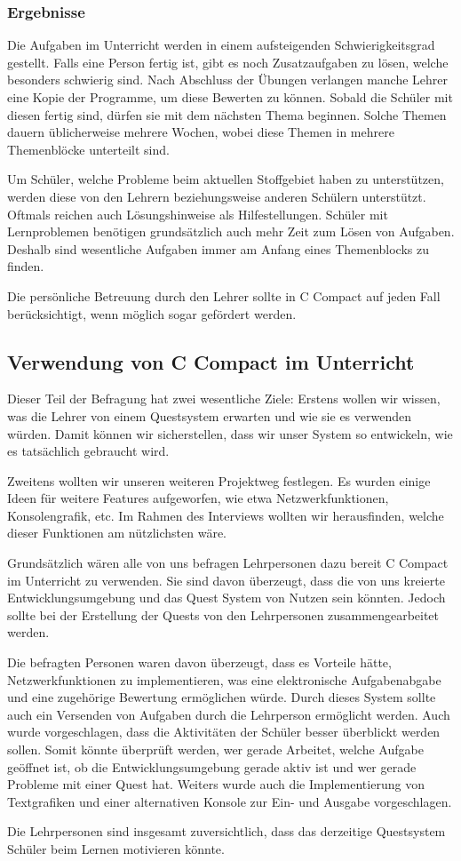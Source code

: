 \subsubsection*{Ergebnisse}

Die Aufgaben im Unterricht werden in einem aufsteigenden Schwierigkeitsgrad gestellt. Falls eine Person fertig ist, gibt es noch Zusatzaufgaben zu lösen, welche besonders schwierig sind. Nach Abschluss der Übungen verlangen manche Lehrer eine Kopie der Programme, um diese Bewerten zu können. Sobald die Schüler mit diesen fertig sind, dürfen sie mit dem nächsten Thema beginnen.
Solche Themen dauern üblicherweise mehrere Wochen, wobei diese Themen in mehrere Themenblöcke unterteilt sind.

Um Schüler, welche Probleme beim aktuellen Stoffgebiet haben zu unterstützen, werden diese von den Lehrern beziehungsweise anderen Schülern unterstützt. Oftmals reichen auch Lösungshinweise als Hilfestellungen. Schüler mit Lernproblemen benötigen grundsätzlich auch mehr Zeit zum Lösen von Aufgaben. Deshalb sind wesentliche Aufgaben immer am Anfang eines Themenblocks zu finden.

Die persönliche Betreuung durch den Lehrer sollte in C Compact auf jeden Fall berücksichtigt, wenn möglich sogar gefördert werden.

\subsection{Verwendung von C Compact im Unterricht}
Dieser Teil der Befragung hat zwei wesentliche Ziele: Erstens wollen wir wissen, was die Lehrer von einem Questsystem erwarten und wie sie es verwenden würden. Damit können wir sicherstellen, dass wir unser System so entwickeln, wie es tatsächlich gebraucht wird.

Zweitens wollten wir unseren weiteren Projektweg festlegen. Es wurden einige Ideen für weitere Features aufgeworfen, wie etwa Netzwerkfunktionen, Konsolengrafik, etc. Im Rahmen des Interviews wollten wir herausfinden, welche dieser Funktionen am nützlichsten wäre.

Grundsätzlich wären alle von uns befragen Lehrpersonen dazu bereit C Compact im Unterricht zu verwenden. Sie sind davon überzeugt, dass die von uns kreierte Entwicklungsumgebung und das Quest System von Nutzen sein könnten. Jedoch sollte bei der Erstellung der Quests von den Lehrpersonen zusammengearbeitet werden.

Die befragten Personen waren davon überzeugt, dass es Vorteile hätte, Netzwerkfunktionen zu implementieren, was eine elektronische Aufgabenabgabe und eine zugehörige Bewertung ermöglichen würde. Durch dieses System sollte auch ein Versenden von Aufgaben durch die Lehrperson ermöglicht werden. Auch wurde vorgeschlagen, dass die Aktivitäten der Schüler besser überblickt werden sollen. Somit könnte überprüft werden, wer gerade Arbeitet, welche Aufgabe geöffnet ist, ob die Entwicklungsumgebung gerade aktiv ist und wer gerade Probleme mit einer Quest hat. Weiters wurde auch die Implementierung von Textgrafiken und einer alternativen Konsole zur Ein- und Ausgabe vorgeschlagen.

Die Lehrpersonen sind insgesamt zuversichtlich, dass das derzeitige Questsystem Schüler beim Lernen motivieren könnte.

